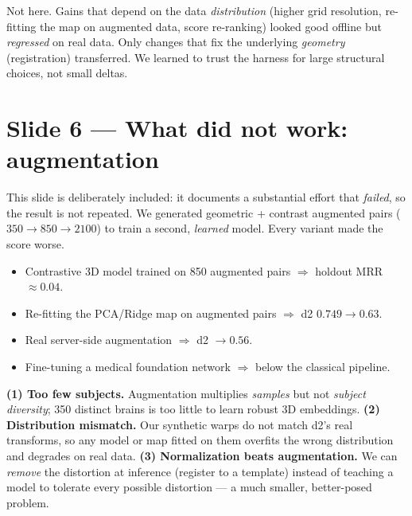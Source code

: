 \documentclass[12pt,a4paper]{article}   %
\begin{document}
\begin{misconception}
Not here. Gains that depend on the data \emph{distribution} (higher grid resolution, re-fitting the
map on augmented data, score re-ranking) looked good offline but \emph{regressed} on real data.
Only changes that fix the underlying \emph{geometry} (registration) transferred. We learned to trust
the harness for large structural choices, not small deltas.
\end{misconception}

\section{Slide 6 --- What did not work: augmentation}
This slide is deliberately included: it documents a substantial effort that \emph{failed}, so the
result is not repeated. We generated geometric + contrast augmented pairs ($350\to850\to2100$) to
train a second, \emph{learned} model. Every variant made the score worse.

\begin{failure}
\begin{itemize}
\item Contrastive 3D model trained on 850 augmented pairs $\Rightarrow$ holdout MRR $\approx0.04$.
\item Re-fitting the PCA/Ridge map on augmented pairs $\Rightarrow$ d2 $0.749\to0.63$.
\item Real server-side augmentation $\Rightarrow$ d2 $\to0.56$.
\item Fine-tuning a medical foundation network $\Rightarrow$ below the classical pipeline.
\end{itemize}
\end{failure}

\begin{theory}
\textbf{(1) Too few subjects.} Augmentation multiplies \emph{samples} but not \emph{subject
diversity}; 350 distinct brains is too little to learn robust 3D embeddings.
\textbf{(2) Distribution mismatch.} Our synthetic warps do not match d2's real transforms, so any
model or map fitted on them overfits the wrong distribution and degrades on real data.
\textbf{(3) Normalization beats augmentation.} We can \emph{remove} the distortion at inference
(register to a template) instead of teaching a model to tolerate every possible distortion --- a
much smaller, better-posed problem.
\end{theory}
\end{document}
